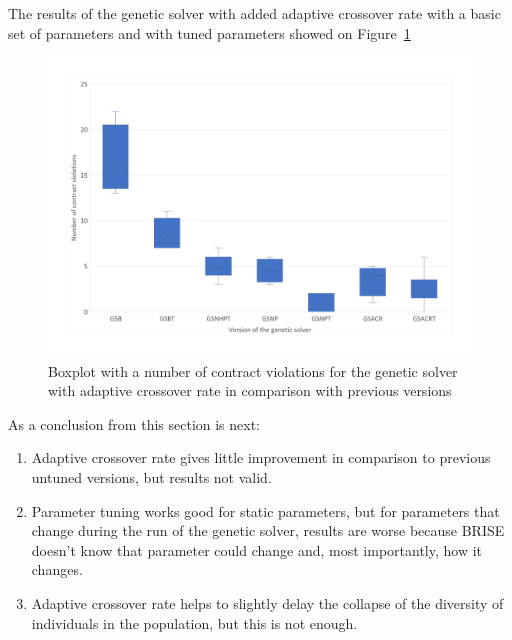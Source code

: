 The results of the genetic solver with added adaptive crossover rate with a basic set of parameters and with tuned parameters showed on Figure~\ref{fig:boxplotsolverAdaptiveCrossoverTuning}
\begin{figure}
	\centering
	\includegraphics[width=\textwidth]{images/BoxPlotSolverAdaptiveCrossoverTuning.pdf}
	\caption[Boxplot with a number of contract violations for the genetic solver with adaptive crossover rate in comparison with previous versions]{Boxplot with a number of contract violations for the genetic solver with adaptive crossover rate in comparison with previous versions}
	\label{fig:boxplotsolverAdaptiveCrossoverTuning}
\end{figure}

As a conclusion from this section is next:
\begin{enumerate}
	\item Adaptive crossover rate gives little improvement in comparison to previous untuned versions, but results not valid.
	\item Parameter tuning works good for static parameters, but for parameters that change during the run of the genetic solver, results are worse because BRISE doesn't know that parameter could change and, most importantly, how it changes.
	\item Adaptive crossover rate helps to slightly delay the collapse of the diversity of individuals in the population, but this is not enough.
\end{enumerate} 


